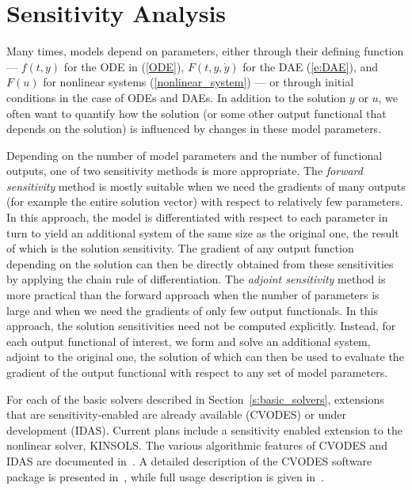 \section{Sensitivity Analysis}\label{s:sensitivity_analysis}

Many times, models depend on parameters, either through their defining
function --- $f(t,y)$ for the ODE in (\ref{ODE}), $F(t,y,{\dot y})$ for the DAE
(\ref{e:DAE}), and $F(u)$ for nonlinear systems (\ref{nonlinear_system})
--- or through initial conditions in the case of ODEs and DAEs.
In addition to the solution $y$ or $u$, we often want to quantify how
the solution (or some other output functional that depends on the solution)
is influenced by changes in these model parameters.

Depending on the number of model parameters and the
number of functional outputs, one of two sensitivity methods
is more appropriate.
%
The {\em forward sensitivity} method is mostly suitable when we need
the gradients of many outputs (for example the entire solution vector)
with respect to relatively few parameters.
In this approach, the model is differentiated with respect to each
parameter in turn to yield an additional system of the same size as
the original one, the result of which is the solution sensitivity.
The gradient of any output function depending on the solution can
then be directly obtained from these sensitivities by applying the
chain rule of differentiation.
%
The {\em adjoint sensitivity} method is more practical than
the forward approach when the number of parameters is large and
when we need the gradients of only few output functionals.
In this approach, the solution sensitivities need not be computed
explicitly. Instead, for each output functional of interest, we form
and solve an additional system, adjoint to the original one, the
solution of which can then be used to evaluate the gradient of the
output functional with respect to any set of model parameters.

For each of the basic solvers described in Section~\ref{s:basic_solvers},
extensions that are sensitivity-enabled are already available (CVODES)
or under development (IDAS). Current plans include a sensitivity
enabled extension to the nonlinear solver, KINSOLS.
The various algorithmic features of CVODES and IDAS are documented
in~\cite{CLPS:03}. A detailed description of the CVODES software package
is presented in~\cite{SeHi:03}, while full usage description is given
in~\cite{HiSe:04cvodes}.
%

